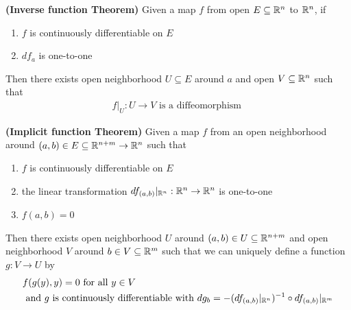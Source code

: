 \documentclass{report}
\begin{document}
\begin{theorem}
\textbf{(Inverse function Theorem)} Given a map $f$ from open $E \subseteq \mathbb{R}^n$ to $\mathbb{R}^n$, if 
\begin{enumerate}[label=(\alph*)]
  \item $f$ is continuously differentiable on $E$ 
  \item $df_a$ is one-to-one 
\end{enumerate}
Then there exists open neighborhood $U\subseteq E$ around $a$ and  open  $V\subseteq \mathbb{R}^n$ such that 
\begin{align*}
f|_U:U\to V\text{ is a diffeomorphism }
\end{align*}
\end{theorem}
\begin{theorem}
\textbf{(Implicit function Theorem)} Given a map $f$ from an open neighborhood around $(a,b) \in E \subseteq \mathbb{R}^{n+m}\to \mathbb{R}^n$ such that 
\begin{enumerate}[label=(\alph*)]
  \item $f$ is continuously differentiable on $E$
  \item the linear transformation $df_{(a,b)}|_{\mathbb{R}^n}:\mathbb{R}^n \to \mathbb{R}^n$ is one-to-one
  \item $f(a,b)=0$
\end{enumerate}
Then there exists open neighborhood $U$ around $(a,b)\in U \subseteq \mathbb{R}^{n+m}$ and open neighborhood $V$ around  $b  \in V \subseteq \mathbb{R}^m$ such that we can uniquely define a function $g:V \to U$ by 
\begin{align*}
&f(g(y),y)=0\text{ for all $y \in V$}\\
&\text{ and }g\text{ is continuously differentiable with }dg_b=- (df_{(a,b)}|_{\mathbb{R}^n})^{-1}\circ df_{(a,b)}|_{\mathbb{R}^m}
\end{align*}
\end{theorem}
\end{document}
